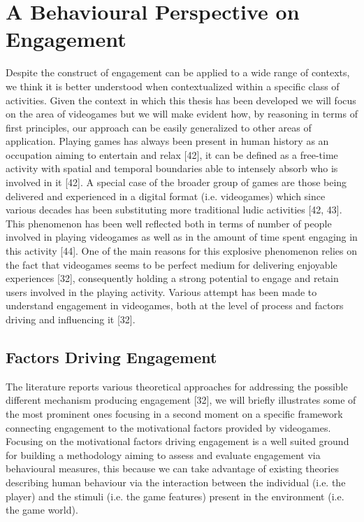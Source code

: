 \section{A Behavioural Perspective on Engagement}
\label{engagement}
Despite the construct of engagement can be applied to a wide range of contexts, we think it is better understood when contextualized within a specific class of activities. Given the context in which this thesis has been developed we will focus on the area of videogames but we will make evident how, by reasoning in terms of first principles, our approach can be easily generalized to other areas of application. Playing games has always been present in human history as an occupation aiming to entertain and relax [42], it can be defined as a free-time activity with spatial and temporal boundaries able to intensely absorb who is involved in it [42]. A special case of the broader group of games are those being delivered and experienced in a digital format (i.e. videogames) which since various decades has been substituting more traditional ludic activities [42, 43]. This phenomenon has been well reflected both in terms of number of people involved in playing videogames as well as in the amount of time spent engaging in this activity [44]. One of the main reasons for this explosive phenomenon relies on the fact that videogames seems to be perfect medium for delivering enjoyable experiences [32], consequently holding a strong potential to engage and retain users involved in the playing activity. Various attempt has been made to understand engagement in videogames, both at the level of process and factors driving and influencing it [32].

\subsection{Factors Driving Engagement}
\label{factors_engagement}
The literature reports various theoretical approaches  for addressing the possible different mechanism producing engagement [32], we will briefly illustrates some of the most prominent ones focusing in a second moment on a specific framework connecting engagement to the motivational factors provided by videogames. Focusing on the motivational factors driving engagement is a well suited ground for building a methodology aiming to assess and evaluate engagement via behavioural measures, this because we can take advantage of existing theories describing human behaviour via the interaction between the individual (i.e. the player) and the stimuli (i.e. the game features) present in the environment (i.e. the game world).

